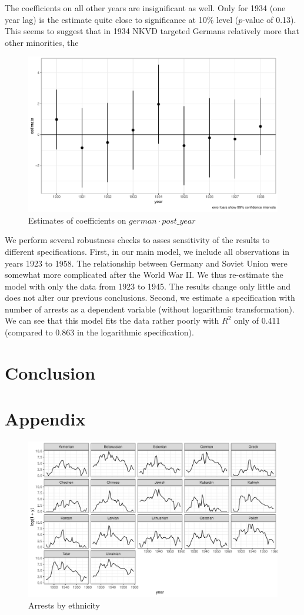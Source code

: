 \documentclass[12pt]{article}
\begin{document}
The coefficients on all other years are insignificant as well. Only for 1934 (one year lag) is the estimate  quite close to significance at 10\% level ($p$-value of 0.13). This seems to suggest that in 1934 NKVD targeted Germans  relatively more that other minorities, the 
\begin{figure}[h]
\centering
\includegraphics[width=\textwidth]{plots/did_effects.pdf}
\caption{Estimates of coefficients on $german \cdot post\_year$}
\label{fig_did_effets}
\end{figure}

We perform several robustness checks to asses sensitivity of the results to different specifications. First, in our main model, we include all observations in years 1923 to 1958. The relationship between Germany and Soviet Union were somewhat more complicated after the World War II. We thus re-estimate the model with only the data from 1923 to 1945. The results change only little and does not alter our previous conclusions. Second, we estimate a specification with number of arrests as a dependent variable (without logarithmic transformation). We can see that this model fits the data rather poorly with  $R^2$ only of 0.411 (compared to 0.863 in the logarithmic specification). 
\section{Conclusion}





\newpage
\section*{Appendix}

\begin{figure}[h]
\centering
\includegraphics[width=\textwidth]{plots/arrests_by_ethnicity.pdf}
\caption{Arrests by ethnicity}
\label{fig:universe}
\end{figure}
\newpage
\thispagestyle{empty}

\end{document}
